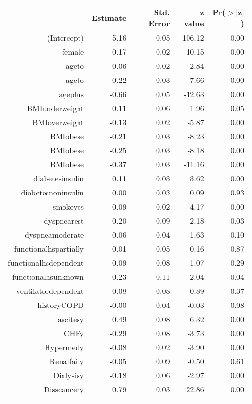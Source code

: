 \bigskip\bigskip
\centering
\begin{tabular}{rrrrr}
  \hline
 & Estimate & Std. Error & z value & Pr($>$$|$z$|$) \\ 
  \hline
(Intercept) & -5.16 & 0.05 & -106.12 & 0.00 \\ 
  female & -0.17 & 0.02 & -10.15 & 0.00 \\ 
  age\-65\-to\-74 & -0.06 & 0.02 & -2.84 & 0.00 \\ 
  age\-75\-to\-84 & -0.22 & 0.03 & -7.66 & 0.00 \\ 
  age\-85\-plus & -0.66 & 0.05 & -12.63 & 0.00 \\ 
  BMI\-underweight & 0.11 & 0.06 & 1.96 & 0.05 \\ 
  BMI\-overweight & -0.13 & 0.02 & -5.87 & 0.00 \\ 
  BMI\-obese\-1 & -0.21 & 0.03 & -8.23 & 0.00 \\ 
  BMI\-obese\-2 & -0.25 & 0.03 & -8.18 & 0.00 \\ 
  BMI\-obese\-3 & -0.37 & 0.03 & -11.16 & 0.00 \\ 
  diabetes\-insulin & 0.11 & 0.03 & 3.62 & 0.00 \\ 
  diabetes\-noninsulin & -0.00 & 0.03 & -0.09 & 0.93 \\ 
  smoke\-yes & 0.09 & 0.02 & 4.17 & 0.00 \\ 
  dyspnea\-rest & 0.20 & 0.09 & 2.18 & 0.03 \\ 
  dyspnea\-moderate & 0.06 & 0.04 & 1.63 & 0.10 \\ 
  functional\-hs\-partially & -0.01 & 0.05 & -0.16 & 0.87 \\ 
  functional\-hs\-dependent & 0.09 & 0.08 & 1.07 & 0.29 \\ 
  functional\-hs\-unknown & -0.23 & 0.11 & -2.04 & 0.04 \\ 
  ventilator\-dependent & -0.08 & 0.08 & -0.89 & 0.37 \\ 
  history\-COPD & -0.00 & 0.04 & -0.03 & 0.98 \\ 
  ascites\-y & 0.49 & 0.08 & 6.32 & 0.00 \\ 
  CHF\-y & -0.29 & 0.08 & -3.73 & 0.00 \\ 
  Hyper\-med\-y & -0.08 & 0.02 & -3.90 & 0.00 \\ 
  Renal\-fail\-y & -0.05 & 0.09 & -0.50 & 0.61 \\ 
  Dialysis\-y & -0.18 & 0.06 & -2.97 & 0.00 \\ 
  Diss\-cancer\-y & 0.79 & 0.03 & 22.86 & 0.00 \\ 
$$
\end{tabular}
